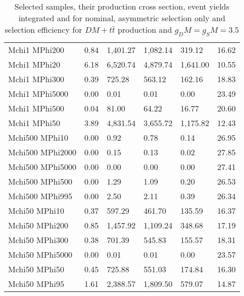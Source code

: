 \begin{table}[h]
\begin{tabular}{l|lllll}
Mchi1     MPhi200  & 0.84 & 1,401.27 & 1,082.14 & 319.12   & 16.62\\
Mchi1     MPhi20   & 6.18 & 6,520.74 & 4,879.74 & 1,641.00 & 10.55\\
Mchi1     MPhi300  & 0.39 & 725.28   & 563.12   & 162.16   & 18.83\\
Mchi1     MPhi5000 & 0.00 & 0.01     & 0.01     & 0.00     & 23.49\\
Mchi1     MPhi500  & 0.04 & 81.00    & 64.22    & 16.77    & 20.60\\
Mchi1     MPhi50   & 3.89 & 4,831.54 & 3,655.72 & 1,175.82 & 12.43\\
Mchi500   MPhi10   & 0.00 & 0.92     & 0.78     & 0.14     & 26.95\\
Mchi500   MPhi2000 & 0.00 & 0.15     & 0.13     & 0.02     & 27.85\\
Mchi500   MPhi5000 & 0.00 & 0.00     & 0.00     & 0.00     & 27.41\\
Mchi500   MPhi500  & 0.00 & 1.29     & 1.09     & 0.20     & 26.53\\
Mchi500   MPhi995  & 0.00 & 2.50     & 2.11     & 0.39     & 26.34\\
Mchi50    MPhi10   & 0.37 & 597.29   & 461.70   & 135.59   & 16.37\\
Mchi50    MPhi200  & 0.85 & 1,457.92 & 1,109.24 & 348.68   & 17.19\\
Mchi50    MPhi300  & 0.38 & 701.39   & 545.83   & 155.57   & 18.31\\
Mchi50    MPhi5000 & 0.00 & 0.01     & 0.01     & 0.00     & 23.57\\
Mchi50    MPhi50   & 0.45 & 725.88   & 551.03   & 174.84   & 16.30\\
Mchi50    MPhi95   & 1.61 & 2,388.57 & 1,809.50 & 579.07   & 14.87\\\hline
\end{tabular}
\caption{Selected samples, their production cross section, event yields integrated and for nominal, asymmetric selection only and selection efficiency for $DM+t\bar{t}$ production and $g_DM=g_SM=3.5$}
\label{tab:dm_dmtt_ps_35}
\end{table}


